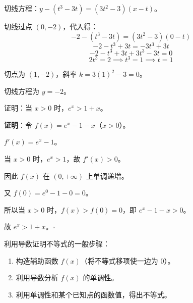\documentclass[12pt, a4paper]{ctexart}
\begin{document}
切线方程：$y - (t^3 - 3t) = (3t^2 - 3)(x - t)$。

切线过点 $(0, -2)$，代入得：
\[
-2 - (t^3 - 3t) = (3t^2 - 3)(0 - t)
\]
\[
-2 - t^3 + 3t = -3t^3 + 3t
\]
\[
-2 - t^3 + 3t + 3t^3 - 3t = 0
\]
\[
2t^3 = 2 \implies t^3 = 1 \implies t = 1
\]

切点为 $(1, -2)$，斜率 $k = 3(1)^2 - 3 = 0$。

切线方程为 $y = -2$。

\begin{center}
\end{center}

\begin{examplebox}[【例题9】利用导数证明不等式]
证明：当 $x > 0$ 时，$e^x > 1 + x$。
\end{examplebox}

\textbf{证明}：令 $f(x) = e^x - 1 - x$（$x > 0$）。

$f'(x) = e^x - 1$。

当 $x > 0$ 时，$e^x > 1$，故 $f'(x) > 0$。

因此 $f(x)$ 在 $(0, +\infty)$ 上单调递增。

又 $f(0) = e^0 - 1 - 0 = 0$。

所以当 $x > 0$ 时，$f(x) > f(0) = 0$，即 $e^x - 1 - x > 0$。

故 $e^x > 1 + x$。\quad $\square$

\begin{tipbox}[方法总结]
利用导数证明不等式的一般步骤：
\begin{enumerate}[leftmargin=2em]
  \item 构造辅助函数 $f(x)$（将不等式移项使一边为 $0$）。
  \item 利用导数分析 $f(x)$ 的单调性。
  \item 利用单调性和某个已知点的函数值，得出不等式。
\end{enumerate}
\end{tipbox}
\end{document}
